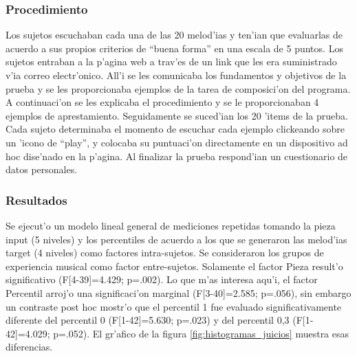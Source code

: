 \subsubsection{Procedimiento}
Los sujetos escuchaban cada una de las 20 melod'ias y ten'ian que evaluarlas de acuerdo a sus propios criterios de ``buena forma'' en una escala de 5 puntos. 
Los sujetos entraban a la p'agina web a trav'es de un link que les era suministrado v'ia correo electr'onico. All'i se les comunicaba los fundamentos y objetivos 
de la prueba y se les proporcionaba ejemplos de la tarea de composici'on del programa. A continuaci'on se les explicaba el procedimiento y se le proporcionaban 4 
ejemplos de aprestamiento. Seguidamente se suced'ian los 20 'items de la prueba. Cada sujeto determinaba el momento de escuchar cada ejemplo clickeando sobre un 
'icono de ``play'', y colocaba su puntuaci'on directamente en un dispositivo ad hoc dise'nado en la p'agina. Al finalizar la prueba respond'ian un 
cuestionario de datos personales. 

\begin{imagen}
    \width{5cm}
\end{imagen}

\subsubsection{Resultados}
Se ejecut'o un modelo lineal general de mediciones repetidas tomando la pieza input (5 niveles) y los percentiles de acuerdo a los que se generaron las melod'ias 
target (4 niveles) como factores intra-sujetos. Se consideraron los grupos de experiencia musical como factor entre-sujetos. 
Solamente el factor Pieza result'o significativo (F[4-39]=4.429; p=.002). Lo que m'as interesa aqu'i, el factor Percentil arroj'o una significaci'on marginal 
(F[3-40]=2.585; p=.056), sin embargo un contraste post hoc mostr'o que el percentil 1 fue evaluado significativamente diferente del percentil 0 (F[1-42]=5.630; p=.023)
y del percentil 0,3 (F[1-42]=4.029; p=.052). El gr'afico de la figura \ref{fig:histogramas_juicios} muestra esas diferencias. 

\begin{imagen}
    \width{9cm}
\end{imagen}

